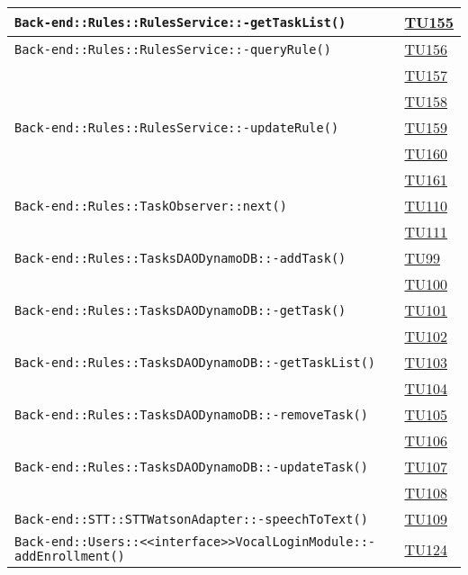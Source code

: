 \begin{longtable}{|>{\centering}m{12cm}|m{1cm}<{\centering}|}
\texttt{Back-end::Rules::RulesService::-\linebreak getTaskList()} & \hyperlink{TU155}{TU155}\\ \hline
\texttt{Back-end::Rules::RulesService::-\linebreak queryRule()} & \hyperlink{TU156}{TU156}\\ & \hyperlink{TU157}{TU157}\\ & \hyperlink{TU158}{TU158}\\ \hline
\texttt{Back-end::Rules::RulesService::-\linebreak updateRule()} & \hyperlink{TU159}{TU159}\\ & \hyperlink{TU160}{TU160}\\ & \hyperlink{TU161}{TU161}\\ \hline
\texttt{Back-end::Rules::TaskObserver::next()} & \hyperlink{TU110}{TU110}\\ & \hyperlink{TU111}{TU111}\\ \hline
\texttt{Back-end::Rules::TasksDAODynamoDB::-\linebreak addTask()} & \hyperlink{TU99}{TU99}\\ & \hyperlink{TU100}{TU100}\\ \hline
\texttt{Back-end::Rules::TasksDAODynamoDB::-\linebreak getTask()} & \hyperlink{TU101}{TU101}\\ & \hyperlink{TU102}{TU102}\\ \hline
\texttt{Back-end::Rules::TasksDAODynamoDB::-\linebreak getTaskList()} & \hyperlink{TU103}{TU103}\\ & \hyperlink{TU104}{TU104}\\ \hline
\texttt{Back-end::Rules::TasksDAODynamoDB::-\linebreak removeTask()} & \hyperlink{TU105}{TU105}\\ & \hyperlink{TU106}{TU106}\\ \hline
\texttt{Back-end::Rules::TasksDAODynamoDB::-\linebreak updateTask()} & \hyperlink{TU107}{TU107}\\ & \hyperlink{TU108}{TU108}\\ \hline
\texttt{Back-end::STT::STTWatsonAdapter::-\linebreak speechToText()} & \hyperlink{TU109}{TU109}\\ \hline
\texttt{Back-end::Users::<<interface>>VocalLoginModule::-\linebreak addEnrollment()} & \hyperlink{TU124}{TU124}\\ \hline

\end{longtable}

